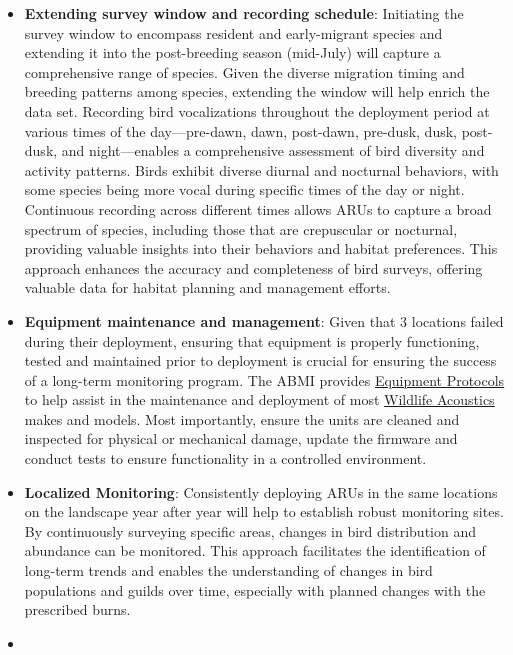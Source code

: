 \documentclass[
  letterpaper,
  DIV=11,
  numbers=noendperiod,
  oneside]{scrartcl}
\begin{document}
\begin{itemize}
\item
  \textbf{Extending survey window and recording schedule}: Initiating
  the survey window to encompass resident and early-migrant species and
  extending it into the post-breeding season (mid-July) will capture a
  comprehensive range of species. Given the diverse migration timing and
  breeding patterns among species, extending the window will help enrich
  the data set. Recording bird vocalizations throughout the deployment
  period at various times of the day---pre-dawn, dawn, post-dawn,
  pre-dusk, dusk, post-dusk, and night---enables a comprehensive
  assessment of bird diversity and activity patterns. Birds exhibit
  diverse diurnal and nocturnal behaviors, with some species being more
  vocal during specific times of the day or night. Continuous recording
  across different times allows ARUs to capture a broad spectrum of
  species, including those that are crepuscular or nocturnal, providing
  valuable insights into their behaviors and habitat preferences. This
  approach enhances the accuracy and completeness of bird surveys,
  offering valuable data for habitat planning and management efforts.
\item
  \textbf{Equipment maintenance and management}: Given that 3 locations
  failed during their deployment, ensuring that equipment is properly
  functioning, tested and maintained prior to deployment is crucial for
  ensuring the success of a long-term monitoring program. The ABMI
  provides
  \href{https://ftp-public.abmi.ca/home/publications/documents/599_ABMI_2021_TerrestrialARUandRemoteCameraTrapProtocols_ABMI.pdf}{Equipment
  Protocols} to help assist in the maintenance and deployment of most
  \href{https://www.wildlifeacoustics.com/}{Wildlife Acoustics} makes
  and models. Most importantly, ensure the units are cleaned and
  inspected for physical or mechanical damage, update the firmware and
  conduct tests to ensure functionality in a controlled environment.
\item
  \textbf{Localized Monitoring}: Consistently deploying ARUs in the same
  locations on the landscape year after year will help to establish
  robust monitoring sites. By continuously surveying specific areas,
  changes in bird distribution and abundance can be monitored. This
  approach facilitates the identification of long-term trends and
  enables the understanding of changes in bird populations and guilds
  over time, especially with planned changes with the prescribed burns.
\item

\end{itemize}
\end{document}
